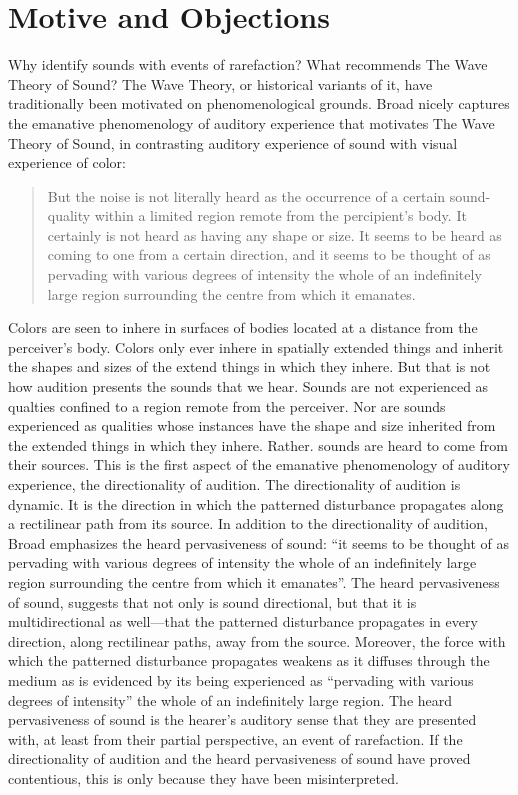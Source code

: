 \documentclass[12pt]{article}
\begin{document}

\section{Motive and Objections} %
\label{sec:motive_and_objections}


Why identify sounds with events of rarefaction? What recommends The Wave Theory of Sound? The Wave Theory, or historical variants of it, have traditionally been motivated on phenomenological grounds. Broad nicely captures the emanative phenomenology of auditory experience that motivates The Wave Theory of Sound, in contrasting auditory experience of sound with visual experience of color:
\begin{quote}
	But the noise is not literally heard as the occurrence of a certain sound-quality within a limited region remote from the percipient's body. It certainly is not heard as having any shape or size. It seems to be heard as coming to one from a certain direction, and it seems to be thought of as pervading with various degrees of intensity the whole of an indefinitely large region surrounding the centre from which it emanates. \citep[5]{Broad:1952kx}
\end{quote}
Colors are seen to inhere in surfaces of bodies located at a distance from the perceiver's body. Colors only ever inhere in spatially extended things and inherit the shapes and sizes of the extend things in which they inhere. But that is not how audition presents the sounds that we hear. Sounds are not experienced as qualties confined to a region remote from the perceiver. Nor are sounds experienced as qualities whose instances have the shape and size inherited from the extended things in which they inhere. Rather. sounds are heard to come from their sources. This is the first aspect of the emanative phenomenology of auditory experience, the directionality of audition. The directionality of audition is dynamic. It is the direction in which the patterned disturbance propagates along a rectilinear path from its source. In addition to the directionality of audition, Broad emphasizes the heard pervasiveness of sound: ``it seems to be thought of as pervading with various degrees of intensity the whole of an indefinitely large region surrounding the centre from which it emanates''. The heard pervasiveness of sound, suggests that not only is sound directional, but that it is multidirectional as well---that the patterned disturbance propagates in every direction, along rectilinear paths, away from the source. Moreover, the force with which the patterned disturbance propagates weakens as it diffuses through the medium as is evidenced by its being experienced as ``pervading with various degrees of intensity'' the whole of an indefinitely large region. The heard pervasiveness of sound is the hearer's auditory sense that they are presented with, at least from their partial perspective, an event of rarefaction. If the directionality of audition and the heard pervasiveness of sound have proved contentious, this is only because they have been misinterpreted.
\end{document}
